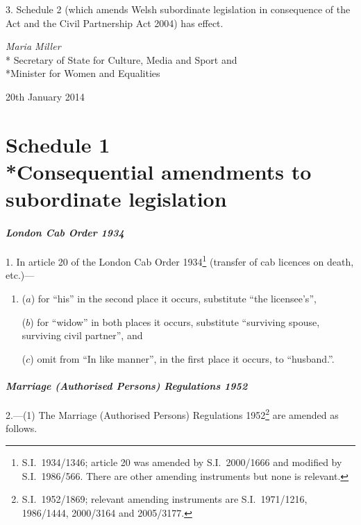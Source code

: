 \documentclass[12pt,a4paper]{article}
\begin{document}
3.  Schedule 2 (which amends Welsh subordinate legislation in consequence of the Act and the Civil Partnership Act 2004) has effect. 

\bigskip

\pagebreak[3]


{\raggedleft
\emph{Maria Miller}\\*
Secretary
of State for Culture, Media and Sport and\\*Minister for Women and Equalities

}

20th January 2014

\small

\part[Schedule 1 --- Consequential amendments to subordinate legislation]{Schedule 1\\*Consequential amendments to subordinate legislation}

\subsection*{\itshape London Cab Order 1934}

1.  In article 20 of the London Cab Order 1934\footnote{S.I.~1934/1346; article 20 was amended by S.I.~2000/1666 and modified by S.I.~1986/566. There are other amending instruments but none is relevant.} (transfer of cab licences on death, etc.)—
\begin{enumerate}\item[]
($a$) for “his” in the second place it occurs, substitute “the licensee’s”,

($b$) for “widow” in both places it occurs, substitute “surviving spouse, surviving civil partner”, and

($c$) omit from “In like manner”, in the first place it occurs, to “husband.”.
\end{enumerate}

\subsection*{\itshape Marriage (Authorised Persons) Regulations 1952}

2.—(1) The Marriage (Authorised Persons) Regulations 1952\footnote{S.I.~1952/1869; relevant amending instruments are S.I.~1971/1216, 1986/1444, 2000/3164 and 2005/3177.} are amended as follows.
\end{document}
